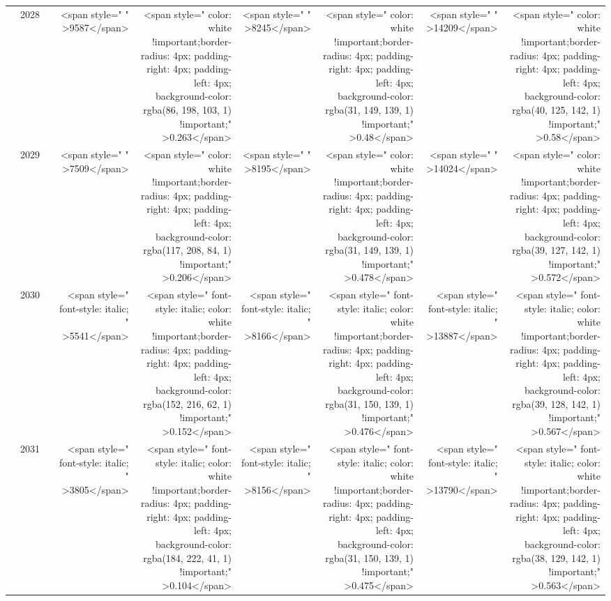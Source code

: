 \begin{table}
\begin{tabular}[t]{>{}l|l>{}rr>{}r|rrrr}
 & 2028 & \cellcolor[HTML]{6A6C71}{\textcolor{white}{3439}} & <span style="     " >9587</span> & <span style="     color: white !important;border-radius: 4px; padding-right: 4px; padding-left: 4px; background-color: rgba(86, 198, 103, 1) !important;" >0.263</span> & <span style="     " >8245</span> & <span style="     color: white !important;border-radius: 4px; padding-right: 4px; padding-left: 4px; background-color: rgba(31, 149, 139, 1) !important;" >0.48</span> & <span style="     " >14209</span> & <span style="     color: white !important;border-radius: 4px; padding-right: 4px; padding-left: 4px; background-color: rgba(40, 125, 142, 1) !important;" >0.58</span>\\

 & 2029 & \cellcolor[HTML]{6C6D72}{\textcolor{white}{3403}} & <span style="     " >7509</span> & <span style="     color: white !important;border-radius: 4px; padding-right: 4px; padding-left: 4px; background-color: rgba(117, 208, 84, 1) !important;" >0.206</span> & <span style="     " >8195</span> & <span style="     color: white !important;border-radius: 4px; padding-right: 4px; padding-left: 4px; background-color: rgba(31, 149, 139, 1) !important;" >0.478</span> & <span style="     " >14024</span> & <span style="     color: white !important;border-radius: 4px; padding-right: 4px; padding-left: 4px; background-color: rgba(39, 127, 142, 1) !important;" >0.572</span>\\

 & 2030 & \cellcolor[HTML]{6C6E72}{\textcolor{white}{3365}} & <span style="  font-style: italic;   " >5541</span> & <span style="  font-style: italic;   color: white !important;border-radius: 4px; padding-right: 4px; padding-left: 4px; background-color: rgba(152, 216, 62, 1) !important;" >0.152</span> & <span style="  font-style: italic;   " >8166</span> & <span style="  font-style: italic;   color: white !important;border-radius: 4px; padding-right: 4px; padding-left: 4px; background-color: rgba(31, 150, 139, 1) !important;" >0.476</span> & <span style="  font-style: italic;   " >13887</span> & <span style="  font-style: italic;   color: white !important;border-radius: 4px; padding-right: 4px; padding-left: 4px; background-color: rgba(39, 128, 142, 1) !important;" >0.567</span>\\

 & 2031 & \cellcolor[HTML]{6D6E72}{\textcolor{white}{3332}} & <span style="  font-style: italic;   " >3805</span> & <span style="  font-style: italic;   color: white !important;border-radius: 4px; padding-right: 4px; padding-left: 4px; background-color: rgba(184, 222, 41, 1) !important;" >0.104</span> & <span style="  font-style: italic;   " >8156</span> & <span style="  font-style: italic;   color: white !important;border-radius: 4px; padding-right: 4px; padding-left: 4px; background-color: rgba(31, 150, 139, 1) !important;" >0.475</span> & <span style="  font-style: italic;   " >13790</span> & <span style="  font-style: italic;   color: white !important;border-radius: 4px; padding-right: 4px; padding-left: 4px; background-color: rgba(38, 129, 142, 1) !important;" >0.563</span>\\


\end{tabular}
\end{table}
